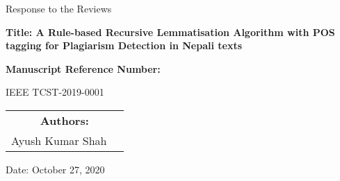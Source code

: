 \begin{titlepage}
\centering
{\LARGE Response to the Reviews \par}
\vspace{1.5cm}

{\large \bfseries Title: 	A Rule-based Recursive Lemmatisation Algorithm with POS tagging for
  Plagiarism Detection in Nepali texts \par}
\vspace{1.5cm}
    
    {\large \bfseries Manuscript Reference Number: \par
    IEEE TCST-2019-0001}
\vspace{1.5cm}
  
\begin{table}[h!]
\renewcommand{\arraystretch}{1}
\centering
\begin{tabular}{lc}
\multicolumn{2}{c}{\large \bfseries Authors:} \\
\large Ayush Kumar Shah \\
\end{tabular}
\end{table}
\vspace{1.5cm}
\large Date: October 27, 2020    

\end{titlepage}
